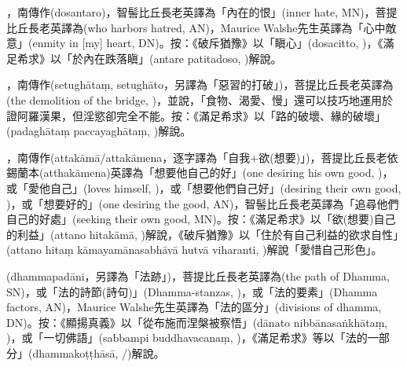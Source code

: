 \startitemgroup[noteitems]
\item{}，南傳作(dosantaro)，智髻比丘長老英譯為「內在的恨」(inner hate, MN)，菩提比丘長老英譯為(who harbors hatred, AN)，Maurice Walshe先生英譯為「心中敵意」(enmity in [my] heart, DN)。按：《破斥猶豫》以「瞋心」(dosacitto, )，《滿足希求》以「於內在跌落瞋」(antare patitadoso, )解說。
\stopitemgroup

\startitemgroup[noteitems]
\item{}，南傳作(setughātaṃ, setughāto，另譯為「惡習的打破」)，菩提比丘長老英譯為(the demolition of the bridge, )，並說，「食物、渴愛、慢」還可以技巧地運用於證阿羅漢果，但淫慾卻完全不能。按：《滿足希求》以「路的破壞、緣的破壞」(padaghātaṃ paccayaghātaṃ, )解說。
\stopitemgroup

\startitemgroup[noteitems]
\item{}，南傳作(attakāmā/attakāmena，逐字譯為「自我+欲(想要)」)，菩提比丘長老依錫蘭本(atthakāmena)英譯為「想要他自己的好」(one desiring his own good, )，或「愛他自己」(loves himself, )，或「想要他們自己好」(desiring their own good, )，或「想要好的」(one desiring the good, AN)，智髻比丘長老英譯為「追尋他們自己的好處」(seeking their own good, MN)。按：《滿足希求》以「欲(想要)自己的利益」(attano hitakāmā, )解說，《破斥猶豫》以「住於有自己利益的欲求自性」(attano hitaṃ kāmayamānasabhāvā hutvā viharanti, )解說「愛惜自己形色」。
\stopitemgroup

\startitemgroup[noteitems]
\item{}(dhammapadāni，另譯為「法跡」)，菩提比丘長老英譯為(the path of Dhamma, SN)，或「法的詩節(詩句)」(Dhamma-stanzas, )，或「法的要素」(Dhamma factors, AN)，Maurice Walshe先生英譯為「法的區分」(divisions of dhamma, DN)。按：《顯揚真義》以「從布施而涅槃被察悟」(dānato nibbānasaṅkhātaṃ, )，或「一切佛語」(sabbampi buddhavacanaṃ, )，《滿足希求》等以「法的一部分」(dhammakoṭṭhāsā, /)解說。
\stopitemgroup

